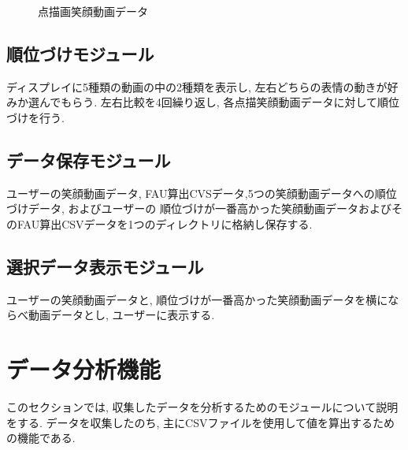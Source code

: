 \begin{figure}[htbp]
    \begin{center}
    \end{center}
    \caption{点描画笑顔動画データ}
    \label{fig:showdata}
\end{figure}

\subsection{順位づけモジュール}
ディスプレイに5種類の動画の中の2種類を表示し, 左右どちらの表情の動きが好みか選んでもらう.
左右比較を4回繰り返し, 各点描笑顔動画データに対して順位づけを行う.

\subsection{データ保存モジュール}
ユーザーの笑顔動画データ, FAU算出CVSデータ,5つの笑顔動画データへの順位づけデータ, およびユーザーの
順位づけが一番高かった笑顔動画データおよびそのFAU算出CSVデータを1つのディレクトリに格納し保存する.

\subsection{選択データ表示モジュール}
ユーザーの笑顔動画データと, 順位づけが一番高かった笑顔動画データを横にならべ動画データとし,
ユーザーに表示する.


\section{データ分析機能}
このセクションでは, 収集したデータを分析するためのモジュールについて説明をする.
データを収集したのち, 主にCSVファイルを使用して値を算出するための機能である.

